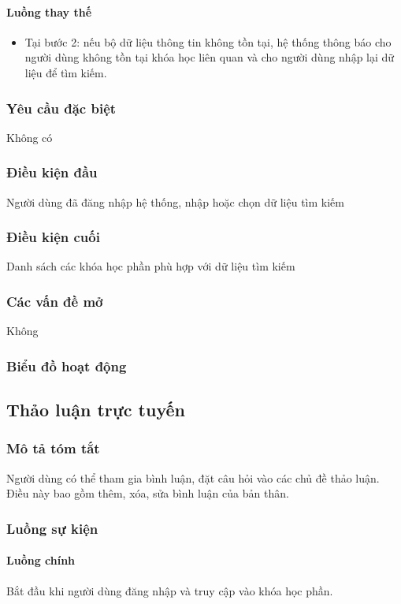 \documentclass[./../main_file.tex]{subfiles}
\begin{document}
\paragraph{Luồng thay thế}
\begin{itemize}
	\item Tại bước 2: nếu bộ dữ liệu thông tin không tồn tại, hệ thống thông báo cho người dùng không tồn tại khóa học liên quan và cho người dùng nhập lại dữ liệu để tìm kiếm.
\end{itemize}
\subsubsection{Yêu cầu đặc biệt}
Không có

\subsubsection{Điều kiện đầu}
Người dùng đã đăng nhập hệ thống, nhập hoặc chọn dữ liệu tìm kiếm

\subsubsection{Điều kiện cuối}
Danh sách các khóa học phần phù hợp với dữ liệu tìm kiếm

\subsubsection{Các vấn đề mở}
Không

\subsubsection{Biểu đồ hoạt động}

\subsection{Thảo luận trực tuyến}
\subsubsection{Mô tả tóm tắt}
Người dùng có thể tham gia bình luận, đặt câu hỏi vào các chủ đề thảo luận. Điều này bao gồm thêm, xóa, sửa bình luận của bản thân.

\subsubsection{Luồng sự kiện}
\paragraph{Luồng chính}
Bắt đầu khi người dùng đăng nhập và truy cập vào khóa học phần.
\end{document}

